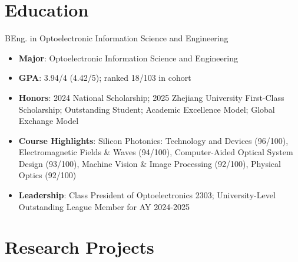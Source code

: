\documentclass{resume}
\begin{document}
\small



\section{Education}

BEng. in Optoelectronic Information Science and Engineering
\begin{itemize} [parsep=0.5ex]
  \item \textbf{Major}: Optoelectronic Information Science and Engineering
  \item \textbf{GPA}: 3.94/4 (4.42/5); ranked 18/103 in cohort
  \item \textbf{Honors}: 2024 National Scholarship; 2025 Zhejiang University First-Class Scholarship; Outstanding Student; Academic Excellence Model; Global Exchange Model
  \item \textbf{Course Highlights}: Silicon Photonics: Technology and Devices (96/100), Electromagnetic Fields \& Waves (94/100), Computer-Aided Optical System Design (93/100), Machine Vision \& Image Processing (92/100), Physical Optics (92/100)
  \item \textbf{Leadership}: Class President of Optoelectronics 2303; University-Level Outstanding League Member for AY 2024-2025
\end{itemize}

\section{Research Projects}
\end{document}
